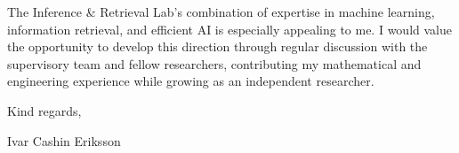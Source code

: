 \documentclass[11pt,a4paper]{moderncv}
\begin{document}
\vspace*{2em}
The Inference \& Retrieval Lab's combination of expertise in machine learning, information retrieval, and efficient AI is especially appealing to me. I would value the opportunity to develop this direction through regular discussion with the supervisory team and fellow researchers, contributing my mathematical and engineering experience while growing as an independent researcher.


\vspace{2em}
Kind regards,

Ivar Cashin Eriksson
\end{document}
